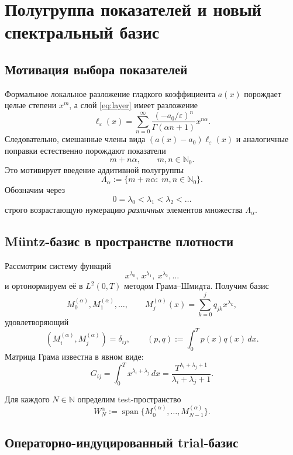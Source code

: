 \documentclass[12pt,a4paper]{article}
\theoremstyle{definition}
\newcommand{\eps}{\varepsilon}
\newcommand{\N}{\mathbb{N}}
\newcommand{\Nc}{\mathbb{N}_0}
\newcommand{\Span}{\operatorname{span}}
\newcommand{\inner}[2]{\left(#1,#2\right)}
\begin{document}
\section{Полугруппа показателей и новый спектральный базис}

\subsection{Мотивация выбора показателей}

Формальное локальное разложение гладкого коэффициента $a(x)$ порождает целые степени $x^m$,
а слой \eqref{eq:layer} имеет разложение
\[
\ell_\eps(x)=\sum_{n=0}^\infty
\frac{(-a_0/\eps)^n}{\Gamma(\alpha n+1)}x^{n\alpha}.
\]
Следовательно, смешанные члены вида $(a(x)-a_0)\ell_\eps(x)$ и аналогичные поправки
естественно порождают показатели
\[
m+n\alpha,\qquad m,n\in\Nc.
\]
Это мотивирует введение аддитивной полугруппы
\begin{equation}
\label{eq:Lambda}
\Lambda_\alpha:=\{m+n\alpha:\; m,n\in\Nc\}.
\end{equation}
Обозначим через
\[
0=\lambda_0<\lambda_1<\lambda_2<\dots
\]
строго возрастающую нумерацию \emph{различных} элементов множества $\Lambda_\alpha$.

\subsection{M\"untz-базис в пространстве плотности}

Рассмотрим систему функций
\[
x^{\lambda_0},\ x^{\lambda_1},\ x^{\lambda_2},\dots
\]
и ортонормируем её в $L^2(0,T)$ методом Грама--Шмидта. Получим базис
\[
M_0^{(\alpha)}, M_1^{(\alpha)},\dots,
\qquad
M_j^{(\alpha)}(x)=\sum_{k=0}^j q_{jk}x^{\lambda_k},
\]
удовлетворяющий
\[
\inner{M_i^{(\alpha)}}{M_j^{(\alpha)}}=\delta_{ij},
\qquad
\inner{p}{q}:=\int_0^T p(x)q(x)\,dx.
\]
Матрица Грама известна в явном виде:
\begin{equation}
\label{eq:Gram}
G_{ij}=\int_0^T x^{\lambda_i+\lambda_j}\,dx
=
\frac{T^{\lambda_i+\lambda_j+1}}{\lambda_i+\lambda_j+1}.
\end{equation}

Для каждого $N\in\N$ определим test-пространство
\begin{equation}
\label{eq:WN}
W_N^\alpha:=\Span\{M_0^{(\alpha)},\dots,M_{N-1}^{(\alpha)}\}.
\end{equation}

\subsection{Операторно-индуцированный trial-базис}
\end{document}
